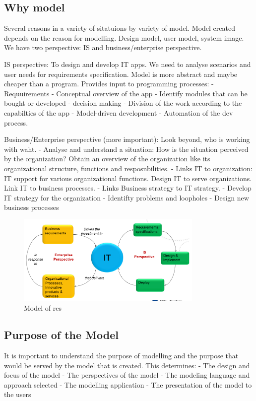 \subsection{Why model}
Several reasons in a variety of sitatuions by variety of model. Model created depends on the reason for modelling. Design model, user model, system image.
We have two perspective: IS and business/enterprise perspective.

IS perspective: To design and develop IT apps. We need to analyse scenarios and user needs for requirements specification. Model is more abstract and maybe cheaper than a program. Provides input to programming processes:
- Requuirements
- Conceptual overview of the app
- Identify modules that can be bought or developed - decision making
- Division of the work according to the capabilties of the app
- Model-driven development - Automation of the dev process.

Business/Enterprise perspective (more important): Look beyond, who is working with waht.
- Analyse and understand a situation: How is the situation perceived by the organization? Obtain an overview of the organization like its organizational structure, functions and resposnbilities. 
- Links IT to organization: IT support for various organizational functions. Design IT to serve organizations. Link IT to business processes.
- Links Business strategy to IT strategy. 
- Develop IT strategy for the organization
- Identifty problems and loopholes
- Design new business processes

\begin{figure}
	\centering
	\includegraphics[width=0.8\textwidth]{images/process.png}
	\caption{Model of res}
	\label{fig:whyModel}
\end{figure}

\subsection{Purpose of the Model}
It is important to understand the purpose of modelling and the purpose that would be served by the model that is created. This determines:
- The design and focus of the model
- The perspectives of the model
- The modeling language and approach selected
- The modelling application
- The presentation of the model to the users